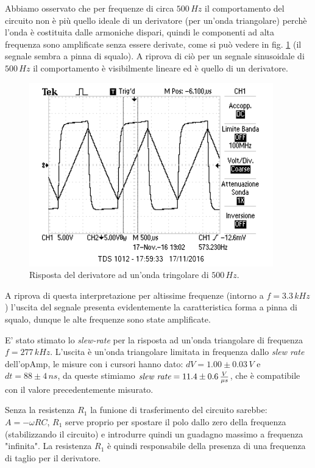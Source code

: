 \documentclass[10pt,a4paper]{article}
\begin{document}
Abbiamo osservato che per frequenze di circa $500 \, Hz$ il comportamento del circuito non è più quello ideale di un derivatore (per un'onda triangolare) perchè l'onda è costituita dalle armoniche dispari, quindi le componenti ad alta frequenza sono amplificate senza essere derivate, come si può vedere in fig. \ref{derivatore500} (il segnale sembra a pinna di squalo). A riprova di ciò per un segnale sinusoidale di $500 \,Hz$ il comportamento è visibilmente lineare ed è quello di un derivatore. 

\begin{figure}[!htb]
\centering
   \includegraphics[scale=1.0]{immagini/freq500derivatore.png}
\caption{Risposta del derivatore ad un'onda tringolare di $500\,Hz$.}
\label{derivatore500}
\end{figure}

A riprova di questa interpretazione per altissime frequenze (intorno a $f=3.3\,kHz$) l'uscita del segnale presenta evidentemente la caratteristica forma a pinna di squalo, dunque le alte frequenze sono state amplificate.

E' stato stimato lo \emph{slew-rate} per la risposta ad un'onda triangolare di frequenza $f=277 \, kHz$. L'uscita è un'onda triangolare limitata in frequenza dallo \emph{slew rate} dell'opAmp, le misure con i cursori hanno dato: $dV = 1.00 \pm 0.03 \, V$ e $dt = 88 \pm 4 \, ns$, da queste stimiamo $ \emph{slew rate} = 11.4 \pm 0.6 \, \frac{V}{\mu s}$, che è compatibile con il valore precedentemente misurato.  

Senza la resistenza $R_1$ la funione di trasferimento del circuito sarebbe: $A = - \omega RC$, $R_1$ serve proprio per spostare il polo dallo zero della frequenza (stabilizzando il circuito) e introdurre quindi un guadagno massimo a frequenza "infinita". La resistenza $R_1$ è quindi responsabile della presenza di una frequenza di taglio per il derivatore.
\end{document}
